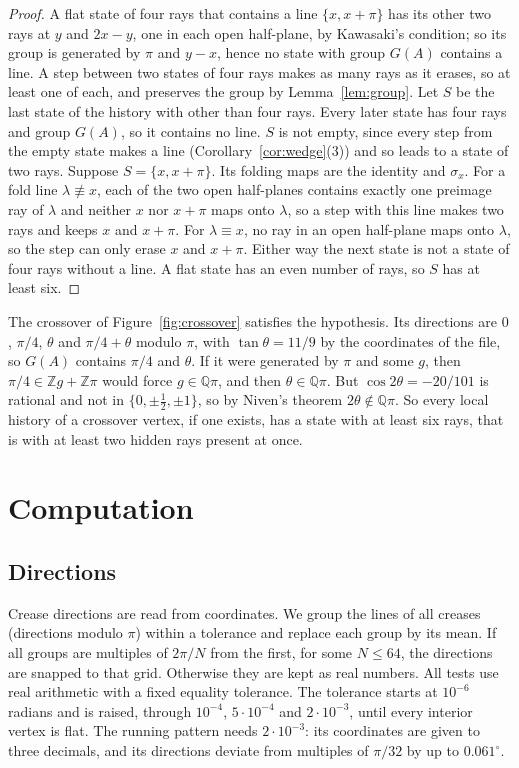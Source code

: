 \documentclass[11pt]{article}
\theoremstyle{definition}
\theoremstyle{remark}
\newcommand{\Z}{\mathbb{Z}}
\begin{document}
\begin{proof}
A flat state of four rays that contains a line $\{x,x+\pi\}$ has its other two rays at $y$ and $2x-y$, one in each open half-plane, by Kawasaki's condition; so its group is generated by $\pi$ and $y-x$, hence no state with group $G(A)$ contains a line. A step between two states of four rays makes as many rays as it erases, so at least one of each, and preserves the group by Lemma~\ref{lem:group}. Let $S$ be the last state of the history with other than four rays. Every later state has four rays and group $G(A)$, so it contains no line. $S$ is not empty, since every step from the empty state makes a line (Corollary~\ref{cor:wedge}(3)) and so leads to a state of two rays. Suppose $S=\{x,x+\pi\}$. Its folding maps are the identity and $\sigma_x$. For a fold line $\lambda\not\equiv x$, each of the two open half-planes contains exactly one preimage ray of $\lambda$ and neither $x$ nor $x+\pi$ maps onto $\lambda$, so a step with this line makes two rays and keeps $x$ and $x+\pi$. For $\lambda\equiv x$, no ray in an open half-plane maps onto $\lambda$, so the step can only erase $x$ and $x+\pi$. Either way the next state is not a state of four rays without a line. A flat state has an even number of rays, so $S$ has at least six.
\end{proof}

The crossover of Figure~\ref{fig:crossover} satisfies the hypothesis. Its directions are $0$, $\pi/4$, $\theta$ and $\pi/4+\theta$ modulo $\pi$, with $\tan\theta=11/9$ by the coordinates of the file, so $G(A)$ contains $\pi/4$ and $\theta$. If it were generated by $\pi$ and some $g$, then $\pi/4\in\Z g+\Z\pi$ would force $g\in\mathbb{Q}\pi$, and then $\theta\in\mathbb{Q}\pi$. But $\cos2\theta=-20/101$ is rational and not in $\{0,\pm\frac12,\pm1\}$, so by Niven's theorem $2\theta\notin\mathbb{Q}\pi$. So every local history of a crossover vertex, if one exists, has a state with at least six rays, that is with at least two hidden rays present at once.

\section{Computation}\label{sec:compute}

\subsection{Directions}

Crease directions are read from coordinates. We group the lines of all creases (directions modulo $\pi$) within a tolerance and replace each group by its mean. If all groups are multiples of $2\pi/N$ from the first, for some $N\le64$, the directions are snapped to that grid. Otherwise they are kept as real numbers. All tests use real arithmetic with a fixed equality tolerance. The tolerance starts at $10^{-6}$ radians and is raised, through $10^{-4}$, $5\cdot10^{-4}$ and $2\cdot10^{-3}$, until every interior vertex is flat. The running pattern needs $2\cdot10^{-3}$: its coordinates are given to three decimals, and its directions deviate from multiples of $\pi/32$ by up to $0.061^\circ$.
\end{document}
